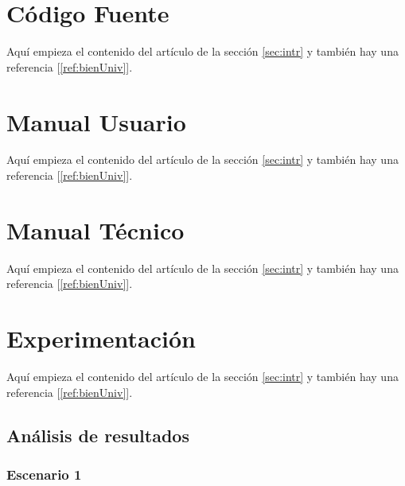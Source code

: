 \documentclass{article}
\begin{document}
\section{Código Fuente}\label{sec:cod}
Aquí empieza el contenido del artículo de la sección \ref{sec:intr} y también hay una referencia [\ref{ref:bienUniv}].



\section{Manual Usuario}\label{sec:man_u}
Aquí empieza el contenido del artículo de la sección \ref{sec:intr} y también hay una referencia [\ref{ref:bienUniv}].



\section{Manual Técnico}\label{sec:man_t}
Aquí empieza el contenido del artículo de la sección \ref{sec:intr} y también hay una referencia [\ref{ref:bienUniv}].



\section{Experimentación}\label{sec:exp}
Aquí empieza el contenido del artículo de la sección \ref{sec:intr} y también hay una referencia [\ref{ref:bienUniv}].

\subsection{Análisis de resultados}

\subsubsection{Escenario 1}
\end{document}
